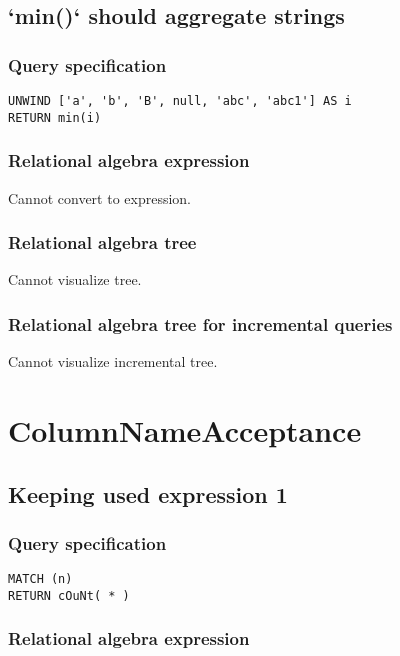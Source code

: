 \subsection{`min()` should aggregate strings}

\subsubsection*{Query specification}

\begin{lstlisting}
UNWIND ['a', 'b', 'B', null, 'abc', 'abc1'] AS i
RETURN min(i)
\end{lstlisting}

\subsubsection*{Relational algebra expression}

Cannot convert to expression.

\subsubsection*{Relational algebra tree}

Cannot visualize tree.

\subsubsection*{Relational algebra tree for incremental queries}

Cannot visualize incremental tree.

\section{ColumnNameAcceptance}

\subsection{Keeping used expression 1}

\subsubsection*{Query specification}

\begin{lstlisting}
MATCH (n)
RETURN cOuNt( * )
\end{lstlisting}

\subsubsection*{Relational algebra expression}

